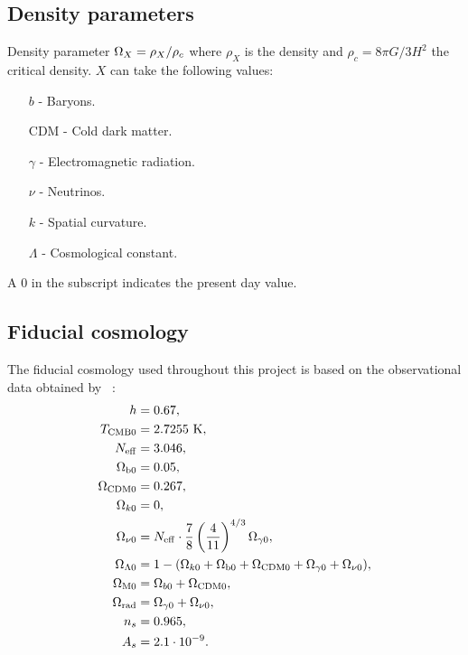 \subsection*{Density parameters}
Density parameter $\Omega_X = \rho_X/\rho_c$ where $\rho_X$ is the density and $\rho_c=8\pi G/3H^2$ the critical density. $X$ can take the following values:
\begin{itemize}
    \item[$b$] - Baryons.
    \item[CDM] - Cold dark matter.
    \item[$\gamma$] - Electromagnetic radiation.
    \item[$\nu$] - Neutrinos.
    \item[$k$] - Spatial curvature.
    \item[$\Lambda$] - Cosmological constant.
\end{itemize}
A $0$ in the subscript indicates the present day value. 

\subsection*{Fiducial cosmology}
The fiducial cosmology used throughout this project is based on the observational data obtained by ~\cite{Planck2020}:
\begin{equation*}
        \begin{split}
                h &= 0.67, \\
                T_\mathrm{CMB0} &= 2.7255\text{ {K}}, \\
                N_\mathrm{eff} &= 3.046, \\
                \Omega_\mathrm{b0} &= 0.05, \\
                \Omega_\mathrm{CDM0} &= 0.267, \\
                \Omega_{k0} &= 0, \\
                \Omega_{\nu0} &= N_\mathrm{eff} \cdot \frac{7}{8}\left(\frac{4}{11}\right)^{4/3}\Omega_{\gamma0}, \\
                \Omega_{\Lambda0} &= 1- (\Omega_{k0} + \Omega_\mathrm{b0} + \Omega_\mathrm{CDM0} + \Omega_{\gamma0} + \Omega_{\nu0}),\\
                \Omega_\mathrm{M0} &= \Omega_{b0} + \Omega_\mathrm{CDM0}, \\
                \Omega_\mathrm{rad} &= \Omega_{\gamma0} + \Omega_{\nu0},\\
                n_s &= 0.965, \\
                A_s &= 2.1\cdot10^{-9}.
        \end{split}
\end{equation*}